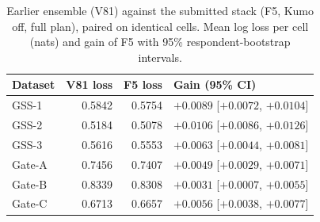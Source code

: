 \begin{table}[t]
\centering\small
\caption{Earlier ensemble (V81) against the submitted stack (F5, Kumo off, full plan), paired on identical cells. Mean log loss per cell (nats) and gain of F5 with 95\% respondent-bootstrap intervals.}
\label{tab:v81f5}
\begin{tabular}{lrrl}
\toprule
Dataset & V81 loss & F5 loss & Gain (95\% CI) \\
\midrule
GSS-1 & 0.5842 & 0.5754 & $+0.0089$ [$+0.0072$, $+0.0104$] \\
GSS-2 & 0.5184 & 0.5078 & $+0.0106$ [$+0.0086$, $+0.0126$] \\
GSS-3 & 0.5616 & 0.5553 & $+0.0063$ [$+0.0044$, $+0.0081$] \\
Gate-A & 0.7456 & 0.7407 & $+0.0049$ [$+0.0029$, $+0.0071$] \\
Gate-B & 0.8339 & 0.8308 & $+0.0031$ [$+0.0007$, $+0.0055$] \\
Gate-C & 0.6713 & 0.6657 & $+0.0056$ [$+0.0038$, $+0.0077$] \\
\bottomrule
\end{tabular}
\end{table}
